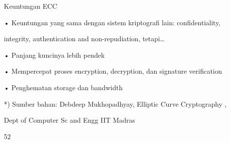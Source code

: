 \documentclass{article}
\begin{document}

Keuntungan ECC

• Keuntungan yang sama dengan sistem kriptografi lain:  confidentiality, 

integrity, authentication and non-repudiation, tetapi…

• Panjang kuncinya lebih pendek

• Mempercepat  proses encryption, decryption, dan signature verification

• Penghematan storage dan bandwidth

*) Sumber bahan: Debdeep Mukhopadhyay, Elliptic Curve Cryptography ,

 Dept of Computer Sc and Engg IIT Madras

52
\end{document}
